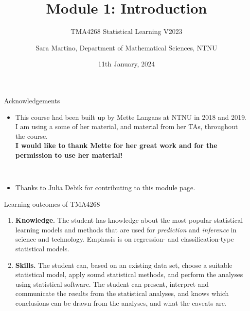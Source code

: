 \documentclass[
  10pt,
  ignorenonframetext,
]{beamer}
\title{Module 1: Introduction}
\subtitle{TMA4268 Statistical Learning V2023}
\author{Sara Martino, Department of Mathematical Sciences, NTNU}
\date{11th January, 2024}
\providecommand{\tightlist}{%
  \setlength{\itemsep}{0pt}\setlength{\parskip}{0pt}}
\begin{document}
\frame{\titlepage}

\begin{frame}{Acknowledgements}
\protect\hypertarget{acknowledgements}{}
\begin{itemize}
\tightlist
\item
  This course had been built up by Mette Langaas at NTNU in 2018 and
  2019. I am using a some of her material, and material from her TAs,
  throughout the course.\\
  \vspace{2mm} \textbf{I would like to thank Mette for her great work
  and for the permission to use her material!}
\end{itemize}

\(~\)

\begin{itemize}
\tightlist
\item
  Thanks to Julia Debik for contributing to this module page.
\end{itemize}
\end{frame}

\begin{frame}{Learning outcomes of TMA4268}
\protect\hypertarget{learning-outcomes-of-tma4268}{}
\begin{enumerate}
\item
  \textbf{Knowledge.} The student has knowledge about the most popular
  statistical learning models and methods that are used for
  \emph{prediction} and \emph{inference} in science and technology.
  Emphasis is on regression- and classification-type statistical models.
\item
  \textbf{Skills.} The student can, based on an existing data set,
  choose a suitable statistical model, apply sound statistical methods,
  and perform the analyses using statistical software. The student can
  present, interpret and communicate the results from the statistical
  analyses, and knows which conclusions can be drawn from the analyses,
  and what the caveats are.
\end{enumerate}
\end{frame}
\end{document}
